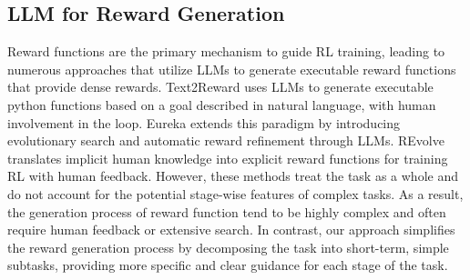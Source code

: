 \subsection{LLM for Reward Generation}\label{sec:related-rewards}
Reward functions are the primary mechanism to guide RL training\cite{devidze2024informativenessrewardfunctionsreinforcement, eschmann2021reward}, leading to numerous approaches that utilize LLMs to generate executable reward functions that provide dense rewards. Text2Reward\cite{xie2024text2reward} uses LLMs to generate executable python functions based on a goal described in natural language, with human involvement in the loop.
Eureka\cite{ma2023eureka} extends this paradigm by introducing evolutionary search and automatic reward refinement through LLMs.
REvolve\cite{hazra2024revolve} translates implicit human knowledge into explicit reward functions for training RL with human feedback.
However, these methods treat the task as a whole and do not account for the potential stage-wise features of complex tasks.
As a result, the generation process of reward function tend to be highly complex and often require human feedback\cite{xie2024text2reward, hazra2024revolve} or extensive search\cite{ma2023eureka}.
In contrast, our approach simplifies the reward generation process by decomposing the task into short-term, simple subtasks, providing more specific and clear guidance for each stage of the task.
